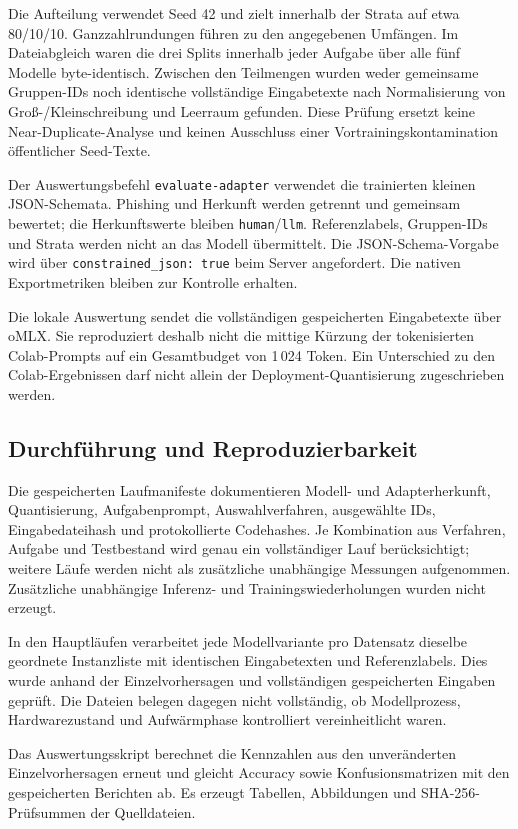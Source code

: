 \documentclass[12pt,twoside=false,a4paper,parskip]{scrbook}
\begin{document}
Die Aufteilung verwendet Seed 42 und zielt innerhalb der Strata auf etwa 80/10/10. Ganzzahlrundungen führen zu den angegebenen Umfängen. Im Dateiabgleich waren die drei Splits innerhalb jeder Aufgabe über alle fünf Modelle byte-identisch. Zwischen den Teilmengen wurden weder gemeinsame Gruppen-IDs noch identische vollständige Eingabetexte nach Normalisierung von Groß-/Kleinschreibung und Leerraum gefunden. Diese Prüfung ersetzt keine Near-Duplicate-Analyse und keinen Ausschluss einer Vortrainingskontamination öffentlicher Seed-Texte.

Der Auswertungsbefehl \texttt{evaluate-adapter} verwendet die trainierten kleinen JSON-Schemata. Phishing und Herkunft werden getrennt und gemeinsam bewertet; die Herkunftswerte bleiben \texttt{human}/\texttt{llm}. Referenzlabels, Gruppen-IDs und Strata werden nicht an das Modell übermittelt. Die JSON-Schema-Vorgabe wird über \texttt{constrained\_json: true} beim Server angefordert. Die nativen Exportmetriken bleiben zur Kontrolle erhalten.

Die lokale Auswertung sendet die vollständigen gespeicherten Eingabetexte über oMLX. Sie reproduziert deshalb nicht die mittige Kürzung der tokenisierten Colab-Prompts auf ein Gesamtbudget von 1\,024 Token. Ein Unterschied zu den Colab-Ergebnissen darf nicht allein der Deployment-Quantisierung zugeschrieben werden.

\subsection{Durchführung und Reproduzierbarkeit}

Die gespeicherten Laufmanifeste dokumentieren Modell- und Adapterherkunft, Quantisierung, Aufgabenprompt, Auswahlverfahren, ausgewählte IDs, Eingabedateihash und protokollierte Codehashes. Je Kombination aus Verfahren, Aufgabe und Testbestand wird genau ein vollständiger Lauf berücksichtigt; weitere Läufe werden nicht als zusätzliche unabhängige Messungen aufgenommen. Zusätzliche unabhängige Inferenz- und Trainingswiederholungen wurden nicht erzeugt.

In den Hauptläufen verarbeitet jede Modellvariante pro Datensatz dieselbe geordnete Instanzliste mit identischen Eingabetexten und Referenzlabels. Dies wurde anhand der Einzelvorhersagen und vollständigen gespeicherten Eingaben geprüft. Die Dateien belegen dagegen nicht vollständig, ob Modellprozess, Hardwarezustand und Aufwärmphase kontrolliert vereinheitlicht waren.

Das Auswertungsskript berechnet die Kennzahlen aus den unveränderten Einzelvorhersagen erneut und gleicht Accuracy sowie Konfusionsmatrizen mit den gespeicherten Berichten ab. Es erzeugt Tabellen, Abbildungen und SHA-256-Prüfsummen der Quelldateien.
\end{document}
